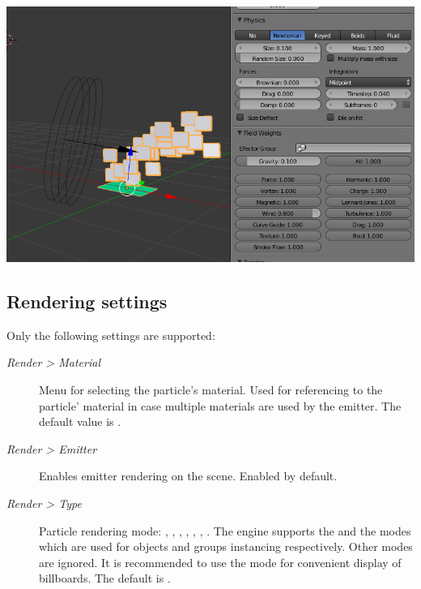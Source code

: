 \documentclass[a4paper,12pt,oneside]{sphinxmanual}
\begin{document}
{\hfill\includegraphics[width=1.000\linewidth]{particles_settings2.jpg}\hfill}


\subsection{Rendering settings}
\label{particles:id11}
Only the following settings are supported:
\begin{description}
\item[{\emph{Render \textgreater{} Material}}] \leavevmode
Menu for selecting the particle's material. Used for referencing to the particle' material in case multiple materials are used by the emitter. The default value is .

\item[{\emph{Render \textgreater{} Emitter}}] \leavevmode
Enables emitter rendering on the scene. Enabled by default.

\item[{\emph{Render \textgreater{} Type}}] \leavevmode
Particle rendering mode: , , , , , , . The engine supports the  and the  modes which are used for objects and groups instancing respectively. Other modes are ignored. It is recommended to use the  mode for convenient display of billboards. The default is .

\end{description}
\end{document}
